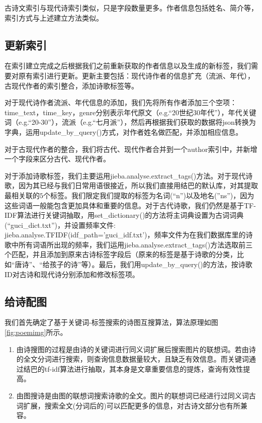 \documentclass[a4paper, 10pt]{article}
\begin{document}
古诗文索引与现代诗索引类似，只是字段数量更多。作者信息包括姓名、简介等，索引方式与上述建立方法类似。

\subsection{更新索引}
在索引建立完成之后根据我们之前重新获取的作者信息以及生成的新标签，我们需要对原有索引进行更新。更新主要包括：现代诗作者的信息扩充（流派、年代），古现代作者的索引整合，添加诗歌标签等。

对于现代诗作者流派、年代信息的添加，我们先将所有作者添加三个空项：time\_text，time\_key，genre分别表示年代原文（e.g.“20世纪30年代”），年代关键词（e.g.“20-30”），流派（e.g.“七月派”），然后再根据我们获取的数据将json转换为字典，运用update\_by\_query()方式，对作者姓名做匹配，并添加相应信息。

对于古现代作者的整合，我们将古代、现代作者合并到一个author索引中，并新增一个字段来区分古代、现代作者。

对于添加诗歌标签，我们主要运用jieba.analyse.extract\_tags()方法。对于现代诗歌，因为其已经与我们日常用语很接近，所以我们直接用结巴的默认库，对其提取最相关联的$5$个标签。我们限定我们提取的标签为名词(“n”)以及地名(”ns”)，因为这些词语一般能包含更加具体和重要的信息。对于古代诗歌，我们仍然是基于TF-IDF算法进行关键词抽取，用set\_dictionary()的方法将主词典设置为古词词典(“guci\_dict.txt”)，并设置频率文件: jieba.analyse.TFIDF(idf\_path='guci\_idf.txt')，频率文件为在我们数据库里的诗歌中所有词语所出现的频率，我们运用jieba.analyse.extract\_tags()方法选取前三个匹配，并且添加到原来古诗标签字段后（原来的标签是基于诗歌的分类，比如“唐诗”、“给孩子的诗”等）。最后，我们用update\_by\_query()的方法，按诗歌ID对古诗和现代诗分别添加和修改标签项。

\subsection{给诗配图}
我们首先确定了基于关键词-标签搜索的诗图互搜算法，算法原理如图\ref{fig:poemimg}所示。
\begin{enumerate}[(1)]
    \item 由诗搜图的过程是由诗的关键词进行同义词扩展后搜索图片的联想词。若由诗的全文分词进行搜索，则查询信息数据量较大，且缺乏有效信息。而关键词通过结巴的tf-idf算法进行抽取，其本身是文章重要信息的提炼，查询有效性提高。
    \item 由图搜诗是由图的联想词搜索诗歌的全文。图片的联想词已经进行过同义词古词扩展，搜索全文(分词后的)可以匹配更多的信息，对古诗文部分也有所兼容。
\end{enumerate}
\end{document}
